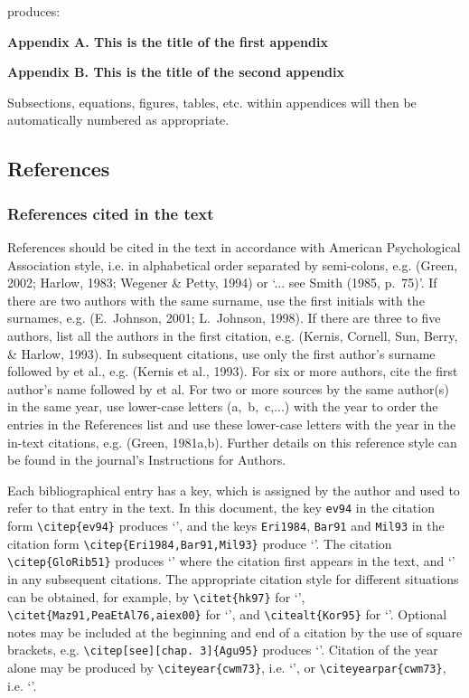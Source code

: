 \documentclass{tATO2e}
\begin{document}
\noindent produces:\medskip

\noindent \textbf{Appendix A. This is the title of the first appendix}\vspace{10pt}

\noindent \textbf{Appendix B. This is the title of the second appendix}

\medskip
Subsections, equations, figures, tables, etc. within
appendices will then be automatically numbered as appropriate.


\subsection{References}\label{refs}

\subsubsection{References cited in the text}

References should be cited in the text in accordance with American Psychological Association style, i.e. in alphabetical order separated by semi-colons, e.g. (Green, 2002; Harlow, 1983; Wegener \& Petty, 1994) or `... see Smith (1985, p.~75)'. If there are two authors with the same surname, use the first initials with the surnames, e.g. (E.~Johnson, 2001; L.~Johnson, 1998). If there are three to five authors, list all the authors in the first citation, e.g. (Kernis, Cornell, Sun, Berry, \& Harlow, 1993). In subsequent citations, use only the first author's surname followed by et al., e.g. (Kernis et al., 1993). For six or more authors, cite the first author's name followed by et al. For two or more sources by the same author(s) in the same year, use lower-case letters (a,~b,~c,...) with the year to order the entries in the References list and use these lower-case letters with the year in the in-text citations, e.g. (Green, 1981a,b). Further details on this reference style can be found in the journal's Instructions for Authors.

Each bibliographical entry has a key, which is assigned by the author and used to refer to that entry in the text. In this document, the key \verb"ev94" in the citation form \verb"\citep{ev94}" produces `\citep{ev94}', and the keys \verb"Eri1984", \verb"Bar91" and \verb"Mil93" in the citation form \verb"\citep{Eri1984,Bar91,Mil93}" produce `\citep{Eri1984,Mil93,Bar91}'. The citation \verb"\citep{GloRib51}" produces `\citep{GloRib51}' where the citation first appears in the text, and `\citep{GloRib51}' in any subsequent citations. The appropriate citation style for different situations can be obtained, for example, by \verb"\citet{hk97}" for `\citet{hk97}', \verb"\citet{Maz91,PeaEtAl76,aiex00}" for `\citet{Maz91,PeaEtAl76,aiex00}', and \verb"\citealt{Kor95}" for `\citealt{Kor95}'. Optional notes may be included at the beginning and end of a citation by the use of square brackets, e.g. \verb"\citep[see][chap. 3]{Agu95}" produces `\citep[see][chap. 3]{Agu95}'. Citation of the year alone may be produced by \verb"\citeyear{cwm73}", i.e. `\citeyear{cwm73}', or \verb"\citeyearpar{cwm73}", i.e. `\citeyearpar{cwm73}'.
\end{document}
